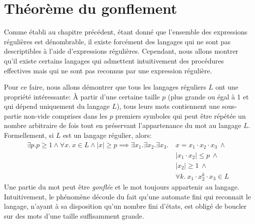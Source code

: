 \section{Théorème du gonflement}

Comme établi au chapitre précédent, étant donné que l'ensemble des expressions régulières est dénombrable, il existe forcément des langages qui ne sont pas descriptibles à l'aide d'expressions régulières.
Cependant, nous allons montrer qu'il existe certains langages qui admettent intuitivement des procédures effectives mais qui ne sont pas reconnus par une expression régulière.

Pour ce faire, nous allons démontrer que tous les langages réguliers $L$ ont une propriété intéressante:
À partir d'une certaine taille $p$ (plus grande ou égal à 1 et qui dépend uniquement du langage $L$), tous leurs mots contiennent une sous-partie non-vide comprises dans les $p$ premiers symboles qui peut être répétée un nombre arbitraire de fois tout en préservant l'appartenance du mot au langage $L$. Formellement, si $L$ est un langage régulier, alors:
\begin{align*}
\exists p. p \geq 1 \wedge \forall x.\ x \in L \wedge |x| \geq p \implies \exists x_1. \exists x_2. \exists x_3.\ &x = x_1 \cdot x_2 \cdot x_3\ \wedge\\
&|x_1 \cdot x_2| \leq p\ \wedge\\
&|x_2| \geq 1\ \wedge\\
&\forall k.\ x_1 \cdot x_2^k \cdot x_3 \in L
\end{align*}
Une partie du mot peut être \textit{gonflée} et le mot toujours appartenir au langage.
Intuitivement, le phénomène découle du fait qu'une automate fini qui reconnait le langage, n'ayant à sa disposition qu'un nombre fini d'états, est obligé de boucler sur des mots d'une taille suffisamment grande.

